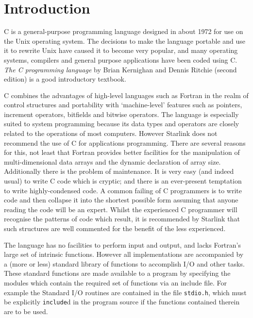 \documentclass[twoside,11pt,nolof,noabs]{starlink}
\begin{document}
\scfrontmatter

\section{Introduction}

C is a general-purpose programming language designed in about 1972 for use on the Unix
operating system.
The decisions to make the language portable and use it to rewrite Unix have
caused it to become very popular, and many operating systems, compilers and
general purpose applications have been coded using C.
{\sl The C programming language} by Brian Kernighan and Dennis Ritchie (second
edition) is a good introductory textbook.

C combines the advantages of high-level languages such as Fortran in the
realm of control structures and portability with `machine-level' features
such as pointers, increment operators, bitfields and bitwise
operators. The language  is especially suited to system programming because
its data types and operators are closely related to the operations of most
computers. However Starlink does not recommend the use of C for
applications programming. There are several reasons for this, not least
that Fortran provides better facilities for the manipulation of
multi-dimensional data arrays and the dynamic declaration of array size.
Additionally there is the problem of maintenance.
It is very easy (and indeed usual) to write C code which is cryptic; and there
is an ever-present temptation to write highly-condensed code.
A common failing of C programmers is to write code and then collapse it
into the shortest possible form assuming that anyone reading the code will be
an expert.
Whilst the experienced C programmer will recognise the patterns of code
which result, it is recommended by Starlink
that such structures are well commented for the benefit of the less
experienced.

The language has no facilities to perform input and output, and lacks
Fortran's large set of intrinsic functions.
However all implementations are accompanied by a (more or less) standard
library of functions to accomplish I/O and other tasks.
These standard functions are made available to  a program by specifying
the modules  which contain the required set of functions via an include file.
For example the Standard I/O routines are contained in the file \texttt{stdio.h},
which must be explicitly \texttt{include}d in the program source if the functions
contained therein are to be used.
\end{document}
